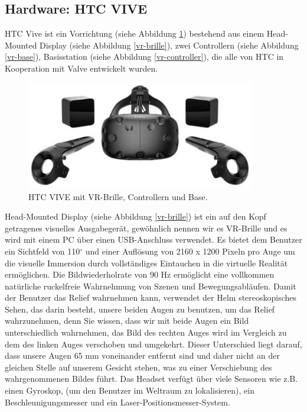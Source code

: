\subsection{Hardware: HTC VIVE} \label{vr-hardware}

HTC Vive ist ein Vorrichtung (siehe Abbildung \ref{htc-base}) bestehend aus einem Head-Mounted Display (siehe Abbildung \ref{vr-brille}), zwei Controllern (siehe Abbildung \ref{vr-base}), Basisstation (siehe Abbildung \ref{vr-controller}), die alle von HTC in Kooperation mit Valve entwickelt wurden.
\begin{figure}[h] \centering
\includegraphics[width=10cm]{Images/htc-base.png} 
\caption[HTC VIVE mit VR-Brille, Controllern und Base.]{ HTC VIVE mit VR-Brille, Controllern und Base\cite{vive19}. }
\label{htc-base} 
\end{figure}


Head-Mounted Display (siehe Abbildung \ref{vr-brille}) ist ein auf den Kopf getragenes visuelles Ausgabeger{\"a}t, gew{\"o}hnlich nennen wir es VR-Brille und es wird mit einem PC {\"u}ber einen USB-Anschluss verwendet.
Es bietet dem Benutzer ein Sichtfeld von 110$^\circ$ und einer Aufl{\"o}sung von 2160 x 1200 Pixeln pro Auge um die visuelle Immersion durch vollst{\"a}ndiges Eintauchen in die virtuelle Realit{\"a}t erm{\"o}glichen. 
Die Bildwiederholrate von 90 Hz erm{\"o}glicht eine vollkommen nat{\"u}rliche ruckelfreie Wahrnehmung von Szenen und Bewegungsabl{\"a}ufen. 
Damit der Benutzer das Relief wahrnehmen kann, verwendet der Helm stereoskopisches Sehen, das darin besteht, unsere beiden Augen zu benutzen, um das Relief wahrzunehmen, denn Sie wissen, dass wir mit beide Augen ein  Bild unterschiedlich wahrnehmen, das Bild des rechten Auges wird im Vergleich zu dem des linken Auges verschoben und umgekehrt. 
Dieser Unterschied liegt darauf, dass unsere Augen 65 mm voneinander entfernt sind und daher nicht an der gleichen Stelle auf unserem Gesicht stehen, was zu einer Verschiebung des wahrgenommenen Bildes f{\"u}hrt. 
Das Headset verf{\"u}gt {\"u}ber viele Sensoren wie z.B. einen Gyroskop, (um den Benutzer im Weltraum zu lokalisieren), ein Beschleunigungsmesser und ein Laser-Positionsmesser-System. \\


